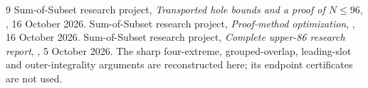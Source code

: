 \documentclass[11pt,a4paper]{article}
\begin{document}
\begin{thebibliography}{9}
 Sum-of-Subset research project,
\emph{Transported hole bounds and a proof of $N\le96$},
, 16 October 2026.
 Sum-of-Subset research project,
\emph{Proof-method optimization},
, 16 October 2026.
 Sum-of-Subset research project,
\emph{Complete upper-86 research report},
, 5 October 2026.
The sharp four-extreme, grouped-overlap, leading-slot and outer-integrality
arguments are reconstructed here; its endpoint certificates are not used.
\end{thebibliography}
\end{document}
